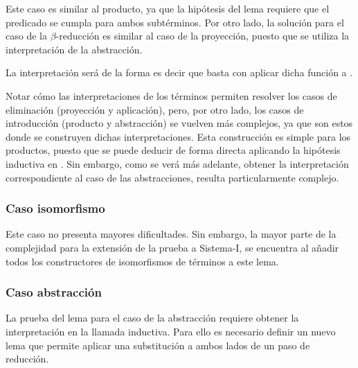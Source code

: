 Este caso es similar al producto, ya que la hipótesis del lema requiere que el predicado se cumpla para ambos subtérminos.
Por otro lado, la solución para el caso de la $\beta$-reducción es similar al caso de la proyección, puesto que se utiliza la interpretación de la abstracción.


La interpretación  será de la forma
\snstar{}
\snstar{}
es decir que basta con aplicar dicha función a .

Notar cómo las interpretaciones de los términos permiten resolver los casos de eliminación (proyección y aplicación), pero, por otro lado, los casos de introducción (producto y abstracción) se vuelven más complejos, ya que son estos donde se construyen dichas interpretaciones.
Esta construcción es simple para los productos, puesto que se puede deducir de forma directa aplicando la hipótesis inductiva en .	
Sin embargo, como se verá más adelante, obtener la interpretación correspondiente al caso de las abstracciones, resulta particularmente complejo.

\subsubsection{Caso isomorfismo}

Este caso no presenta mayores dificultades. Sin embargo, la mayor parte de la complejidad para la extensión de la prueba a Sistema-I, se encuentra al añadir todos los constructores de isomorfismos de términos a este lema.


\subsubsection{Caso abstracción}

La prueba del lema para el caso de la abstracción requiere obtener la interpretación  en la llamada inductiva.
Para ello es necesario definir un nuevo lema que permite aplicar una substitución a ambos lados de un paso de reducción.

